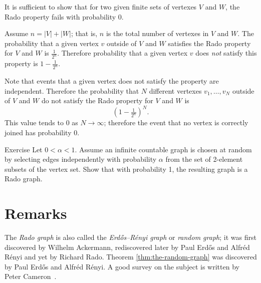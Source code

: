 It is sufficient to show that for two given finite sets of vertexes $V$ and $W$, the Rado property fails with probability 0.

Assume $n=|V|+|W|$; that is, $n$ is the total number of vertexes in $V$ and $W$.
The probability that a given vertex $v$ outside of $V$ and $W$ satisfies the Rado property for $V$ and $W$
is $\tfrac1{2^n}$.
Therefore probability that a given vertex $v$ does {}\emph{not} satisfy this property
is $1-\tfrac1{2^n}$.

Note that events that a given vertex does not satisfy the property are independent.
Therefore the probability that $N$ different vertexes $v_1,\dots,v_N$ outside of $V$ and $W$ do not satisfy the Rado property for $V$ and $W$ is 
\[(1-\tfrac1{2^n})^N.\]
This value tends to 0 as $N \to \infty$; 
therefore the event that no vertex is correctly joined has probability 0.
\qeds

\begin{thm}{Exercise}
Let $0<\alpha<1$.
Assume an infinite countable graph is chosen at random by selecting edges independently with probability $\alpha$ from the set of 2-element subsets of the vertex set.
Show that with probability 1, the resulting graph is a Rado graph.
\end{thm}

\section*{Remarks}

The {}\emph{Rado graph} is also called the \emph{Erd\H{o}s–R\'enyi graph} or \emph{random graph};
it was first discovered by Wilhelm Ackermann, rediscovered later by
Paul Erd\H{o}s and Alfr\'ed R\'enyi and yet by Richard Rado. 
Theorem \ref{thm:the-random-graph} was discovered by Paul Erd\H{o}s and Alfr\'ed R\'enyi.
A good survey on the subject is written by Peter Cameron~\cite{cameron}.


